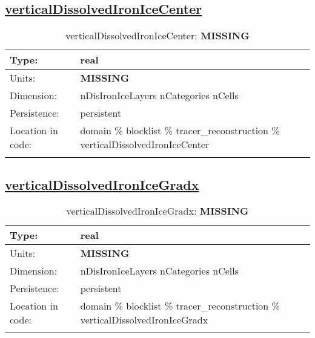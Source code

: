 \subsection[verticalDissolvedIronIceCenter]{\hyperref[sec:var_tab_tracer_reconstruction]{verticalDissolvedIronIceCenter}}
\label{subsec:var_sec_tracer_reconstruction_verticalDissolvedIronIceCenter}
\begin{center}
\begin{longtable}{| p{2.0in} | p{4.0in} |}
        \hline 
        Type: & real \\
        \hline 
        Units: & {\bf \color{red} MISSING} \\
        \hline 
        Dimension: & nDisIronIceLayers nCategories nCells \\
        \hline 
        Persistence: & persistent \\
        \hline 
         Location in code: & domain \% blocklist \% tracer\_reconstruction \% verticalDissolvedIronIceCenter \\
         \hline 
    \caption{verticalDissolvedIronIceCenter: {\bf \color{red} MISSING}}
\end{longtable}
\end{center}
\subsection[verticalDissolvedIronIceGradx]{\hyperref[sec:var_tab_tracer_reconstruction]{verticalDissolvedIronIceGradx}}
\label{subsec:var_sec_tracer_reconstruction_verticalDissolvedIronIceGradx}
\begin{center}
\begin{longtable}{| p{2.0in} | p{4.0in} |}
        \hline 
        Type: & real \\
        \hline 
        Units: & {\bf \color{red} MISSING} \\
        \hline 
        Dimension: & nDisIronIceLayers nCategories nCells \\
        \hline 
        Persistence: & persistent \\
        \hline 
         Location in code: & domain \% blocklist \% tracer\_reconstruction \% verticalDissolvedIronIceGradx \\
         \hline 
    \caption{verticalDissolvedIronIceGradx: {\bf \color{red} MISSING}}
\end{longtable}
\end{center}
